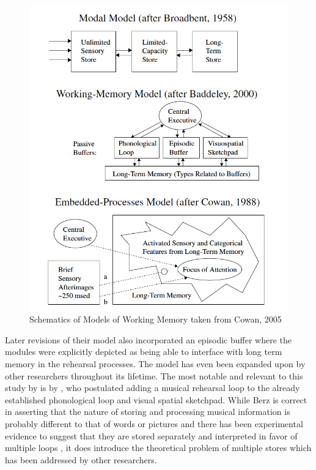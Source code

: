 \documentclass[]{book}
\theoremstyle{definition}
\theoremstyle{definition}
\theoremstyle{definition}
\theoremstyle{remark}
\begin{document}
\begin{figure}

{\centering \includegraphics[width=9.81in]{img/wm_models} 

}

\caption{Schematics of Models of Working Memory taken from Cowan, 2005}\label{fig:unnamed-chunk-1}
\end{figure}

Later revisions of their model also incorporated an episodic buffer
\citep{baddeleyEpisodicBufferNew2000} where the modules were explicitly
depicted as being able to interface with long term memory in the
rehearsal processes. The model has even been expanded upon by other
researchers throughout its lifetime. The most notable and relevant to
this study by is by \citep{berzWorkingMemoryMusic1995}, who postulated
adding a musical rehearsal loop to the already established phonological
loop and visual spatial sketchpad. While Berz is correct in asserting
that the nature of storing and processing musical information is
probably different to that of words or pictures and there has been
experimental evidence to suggest that they are stored separately
\citep{williamsonMusiciansNonmusiciansShortterm2010} and interpreted in
favor of multiple loops \citep{wollnerAttentionalFlexibilityMemory2016}
, it does introduce the theoretical problem of multiple stores which has
been addressed by other researchers.
\end{document}
